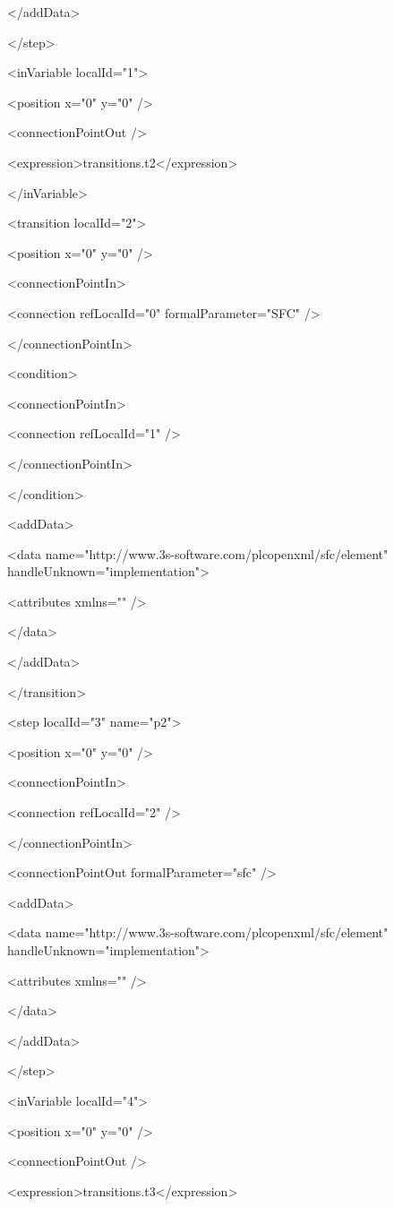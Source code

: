 {  </addData>

 </step>

 <inVariable localId="1">

  <position x="0" y="0" />

  <connectionPointOut />

  <expression>transitions.t2</expression>

 </inVariable>

 <transition localId="2">

  <position x="0" y="0" />

  <connectionPointIn>

   <connection refLocalId="0" formalParameter="SFC" />

  </connectionPointIn>

  <condition>

   <connectionPointIn>

    <connection refLocalId="1" />

   </connectionPointIn>

  </condition>

  <addData>

   <data name="http://www.3s-software.com/plcopenxml/sfc/element" handleUnknown="implementation">

    <attributes xmlns="" />

   </data>

  </addData>

 </transition>

 <step localId="3" name="p2">

  <position x="0" y="0" />

  <connectionPointIn>

   <connection refLocalId="2" />

  </connectionPointIn>

  <connectionPointOut formalParameter="sfc" />

  <addData>

   <data name="http://www.3s-software.com/plcopenxml/sfc/element" handleUnknown="implementation">

    <attributes xmlns="" />

   </data>

  </addData>

 </step>

 <inVariable localId="4">

  <position x="0" y="0" />

  <connectionPointOut />

  <expression>transitions.t3</expression>

}
